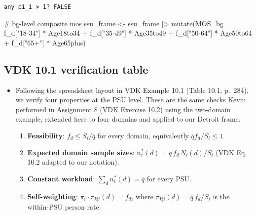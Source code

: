 \documentclass[
  11pt,
]{article}
\newenvironment{Shaded}{\begin{snugshade}}{\end{snugshade}}
\newcommand{\AttributeTok}[1]{\textcolor[rgb]{0.40,0.45,0.13}{#1}}
\newcommand{\CommentTok}[1]{\textcolor[rgb]{0.37,0.37,0.37}{#1}}
\newcommand{\FunctionTok}[1]{\textcolor[rgb]{0.28,0.35,0.67}{#1}}
\newcommand{\NormalTok}[1]{\textcolor[rgb]{0.00,0.23,0.31}{#1}}
\newcommand{\OtherTok}[1]{\textcolor[rgb]{0.00,0.23,0.31}{#1}}
\newcommand{\SpecialCharTok}[1]{\textcolor[rgb]{0.37,0.37,0.37}{#1}}
\newcommand{\StringTok}[1]{\textcolor[rgb]{0.13,0.47,0.30}{#1}}
\providecommand{\tightlist}{%
  \setlength{\itemsep}{0pt}\setlength{\parskip}{0pt}}\usepackage{longtable,booktabs,array}
\begin{document}
\begin{verbatim}
any pi_i > 1? FALSE 
\end{verbatim}

\begin{Shaded}
\begin{Highlighting}[]
\CommentTok{\# bg{-}level composite mos}
\NormalTok{ssu\_frame }\OtherTok{\textless{}{-}}\NormalTok{ ssu\_frame }\SpecialCharTok{|\textgreater{}}
  \FunctionTok{mutate}\NormalTok{(}\AttributeTok{MOS\_bg =}\NormalTok{ f\_d[}\StringTok{"18{-}34"}\NormalTok{] }\SpecialCharTok{*}\NormalTok{ Age18to34 }\SpecialCharTok{+}\NormalTok{ f\_d[}\StringTok{"35{-}49"}\NormalTok{] }\SpecialCharTok{*}\NormalTok{ Age35to49 }\SpecialCharTok{+}
\NormalTok{           f\_d[}\StringTok{"50{-}64"}\NormalTok{] }\SpecialCharTok{*}\NormalTok{ Age50to64 }\SpecialCharTok{+}\NormalTok{ f\_d[}\StringTok{"65+"}\NormalTok{] }\SpecialCharTok{*}\NormalTok{ Age65plus)}
\end{Highlighting}
\end{Shaded}

\subsection{VDK 10.1 verification table}\label{sec-vdk-verify}

\begin{itemize}
\item
  Following the spreadsheet layout in VDK Example 10.1 (Table 10.1,
  p.~284), we verify four properties at the PSU level. These are the
  same checks Kevin performed in Assignment 8 (VDK Exercise 10.2) using
  the two-domain example, extended here to four domains and applied to
  our Detroit frame.

  \begin{enumerate}
  \def\labelenumi{\arabic{enumi}.}
  \tightlist
  \item
    \textbf{Feasibility}: \(f_d \leq S_i / \bar{q}\) for every domain,
    equivalently \(\bar{q} f_d / S_i \leq 1\).
  \item
    \textbf{Expected domain sample sizes}:
    \(n^*_i(d) = \bar{q} \, f_d \, N_i(d) / S_i\) (VDK Eq. 10.2 adapted
    to our notation).
  \item
    \textbf{Constant workload}: \(\sum_d n^*_i(d) = \bar{q}\) for every
    PSU.
  \item
    \textbf{Self-weighting}: \(\pi_i \cdot \pi_{k|i}(d) = f_d\), where
    \(\pi_{k|i}(d) = \bar{q} \, f_d / S_i\) is the within-PSU person
    rate.
  \end{enumerate}
\end{itemize}
\end{document}
